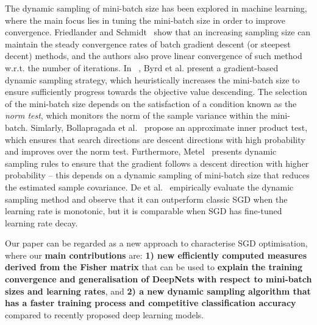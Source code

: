 \documentclass[10pt,journal,compsoc]{IEEEtran}
\begin{document}
The dynamic sampling of mini-batch size has been explored in machine learning, where the main focus lies in tuning the mini-batch size in order to improve convergence.
Friedlander and Schmidt~\cite{friedlander2012hybrid} show that an increasing sampling size can maintain the steady convergence rates of batch gradient descent (or steepest decent) methods, and  the authors also prove linear convergence of such method w.r.t. the number of iterations.
In ~\cite{byrd2012sample}, Byrd et al. present a gradient-based dynamic sampling strategy, which heuristically increases the mini-batch size to ensure sufficiently progress towards the objective value descending.
The selection of the mini-batch size depends on the satisfaction of a condition known as the \textit{norm test}, which monitors the norm of the sample variance within the mini-batch.
Simlarly, Bollapragada et al.~\cite{bollapragada2017adaptive} propose an approximate inner product test, which ensures that search directions are descent directions with high probability and improves over the norm test.
Furthermore, Metel~\cite{metel2017mini} presents dynamic sampling rules to ensure that the gradient follows a descent direction with higher probability -- this depends on a dynamic sampling of mini-batch size that reduces the estimated sample covariance.
De et al.~\cite{de2016big} empirically evaluate the dynamic sampling method and observe that it can outperform classic SGD when the learning rate is monotonic, but it is comparable when SGD has fine-tuned learning rate decay.


Our paper can be regarded as a new approach to characterise SGD optimisation, where our {\bf main contributions} are: {\bf1)  new efficiently computed measures derived from the Fisher matrix} that can be used to {\bf explain the training convergence and generalisation of DeepNets with respect to mini-batch sizes and learning rates}, and {\bf 2) a new dynamic sampling algorithm that has a faster training process and competitive classification accuracy} compared to recently proposed deep learning models.%
\end{document}
